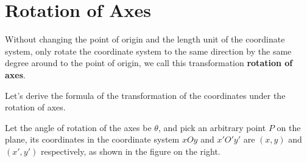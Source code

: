\documentclass{report}
\begin{document}
\newpage
\section{Rotation of Axes}
Without changing the point of origin and the length unit of the coordinate
system, only rotate the coordinate system to the same direction by the same
degree around to the point of origin, we call this transformation
\textbf{rotation of axes}.

Let's derive the formula of the transformation of the coordinates under the
rotation of axes.

Let the angle of rotation of the axes be $\theta$, and pick an arbitrary point
$P$ on the plane, its coordinates in the coordinate system $xOy$ and $x'O'y'$
are $(x, y)$ and $(x', y')$ respectively, as shown in the figure on the right.
\end{document}
